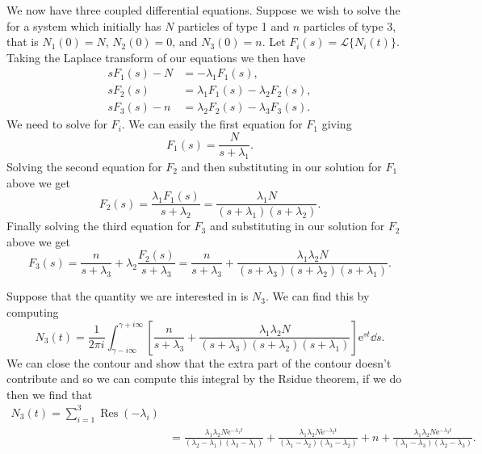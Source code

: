 \documentclass[fleqn]{NotesClass}
\newcommand*{\e}{\mathrm{e}}
\DeclareMathOperator{\Res}{Res}
\newcommand*{\laplaceTransform}{\mathcal{L}}
\begin{document}
    We now have three coupled differential equations.
    Suppose we wish to solve the for a system which initially has \(N\) particles of type 1 and \(n\) particles of type 3, that is \(N_1(0) = N\), \(N_2(0) = 0\), and \(N_3(0) = n\).
    Let \(F_i(s) = \laplaceTransform\{N_i(t)\}\).
    Taking the Laplace transform of our equations we then have
    \begin{align}
        sF_1(s) - N &= -\lambda_1F_1(s),\\
        sF_2(s) &= \lambda_1F_1(s) - \lambda_2F_2(s),\\
        sF_3(s) - n &= \lambda_2F_2(s) - \lambda_3F_3(s).
    \end{align}
    We need to solve for \(F_i\).
    We can easily the first equation for \(F_1\) giving
    \begin{equation}
        F_1(s) = \frac{N}{s + \lambda_1}.
    \end{equation}
    Solving the second equation for \(F_2\) and then substituting in our solution for \(F_1\) above we get
    \begin{equation}
        F_2(s) = \frac{\lambda_1F_1(s)}{s + \lambda_2} = \frac{\lambda_1N}{(s + \lambda_1)(s + \lambda_2)}.
    \end{equation}
    Finally solving the third equation for \(F_3\) and substituting in our solution for \(F_2\) above we get
    \begin{equation}
        F_3(s) = \frac{n}{s + \lambda_3} + \lambda_2\frac{F_2(s)}{s + \lambda_3} = \frac{n}{s + \lambda_3} + \frac{\lambda_1\lambda_2N}{(s + \lambda_3)(s + \lambda_2)(s + \lambda_1)}.
    \end{equation}
    
    Suppose that the quantity we are interested in is \(N_3\).
    We can find this by computing
    \begin{equation}
        N_3(t) = \frac{1}{2\pi i} \int_{\gamma - i\infty}^{\gamma + i\infty} \left[ \frac{n}{s + \lambda_3} + \frac{\lambda_1\lambda_2N}{(s + \lambda_3)(s + \lambda_2)(s + \lambda_1)} \right] \e^{st} \dd{s}.
    \end{equation}
    We can close the contour and show that the extra part of the contour doesn't contribute and so we can compute this integral by the Rsidue theorem, if we do then we find that
    \begin{align}
        N_3(t) = \sum_{i = 1}^{3} \Res(-\lambda_i)\\
        &= \frac{\lambda_1\lambda_2N\e^{-\lambda_1t}}{(\lambda_2 - \lambda_1)(\lambda_3 - \lambda_1)} + \frac{\lambda_1\lambda_2N\e^{-\lambda_2t}}{(\lambda_1 - \lambda_2)(\lambda_3 - \lambda_2)} + n + \frac{\lambda_1\lambda_2N\e^{-\lambda_3t}}{(\lambda_1 - \lambda_3)(\lambda_2 - \lambda_3)}.
    \end{align}
    
\end{document}
